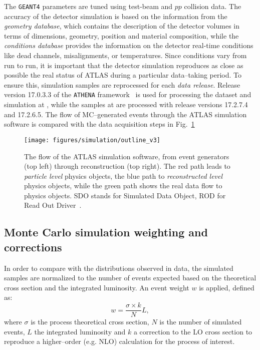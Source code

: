 The \texttt{GEANT4} parameters are tuned using test-beam and $pp$
collision data. The accuracy of the detector simulation is based on
the information from the {\it geometry database}, which contains the
description of the detector volumes in terms of dimensions, geometry,
position and material composition, while the {\it conditions database}
provides the information on the detector real-time conditions like
dead channels, misalignments, or temperatures. Since conditions vary
from run to run, it is important that the detector simulation
reproduces as close as possible the real status of ATLAS during a
particular data--taking period. To ensure this, simulation samples are
reprocessed for each {\it data release}. 
Release version 17.0.3.3 of the \texttt{ATHENA}
framework~\cite{Calafiura:865624} is used for processing the dataset
and simulation at \seventev{}, while the samples at \eighttev{} are
processed with release versions 17.2.7.4 and 17.2.6.5.
The flow of MC--generated events through the ATLAS simulation software
is compared with the data acquisition steps in Fig.~\ref{fig:outline}
\begin{figure}[htb]\begin{center}
    \texttt{[image: figures/simulation/outline\_v3]}
    \caption{The flow of the ATLAS simulation software, from event
      generators (top left) through reconstruction (top right). The
      red path leads to {\it particle level} physics objects, the blue
      path to  {\it reconstructed level} physics objects, while the
      green path shows the real data flow to physics objects. SDO
      stands for Simulated Data Object, ROD for Read Out
      Driver~\cite{atlas_sim}.\label{fig:outline}} 
\end{center}\end{figure}

\subsection{Monte Carlo simulation weighting and corrections}
\label{sec:mcweights}

In order to compare with the distributions observed in data, the
simulated samples are normalized to the number of events expected
based on the theoretical cross section and the integrated luminosity.
An event weight $w$ is applied, defined as:
\begin{equation}\label{eq:mcweight}
w = \dfrac{\sigma\times k}{N} L,
\end{equation}
where $\sigma$ is the process theoretical cross section, $N$ is the
number of simulated events, $L$ the integrated luminosity and $k$ a
correction to the LO cross section to reproduce a higher--order
(e.g. NLO) calculation for the process of interest.

